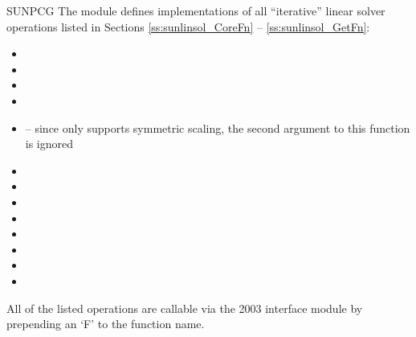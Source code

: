 {SUNPCG}
%
%
\noindent The {\sunlinsolpcg} module defines implementations of all
``iterative'' linear solver operations listed in Sections
\ref{ss:sunlinsol_CoreFn} -- \ref{ss:sunlinsol_GetFn}:
\begin{itemize}
\item {}
\item {}
\item {}
\item {}
\item {} -- since {\pcg} only
  supports symmetric scaling, the second {\nvector} argument to this
  function is ignored
\item {}
\item {}
\item {}
\item {}
\item {}
\item {}
\item {}
\item {}
\end{itemize}
All of the listed operations are callable via the {\F} 2003 interface module
by prepending an `F' to the function name.

